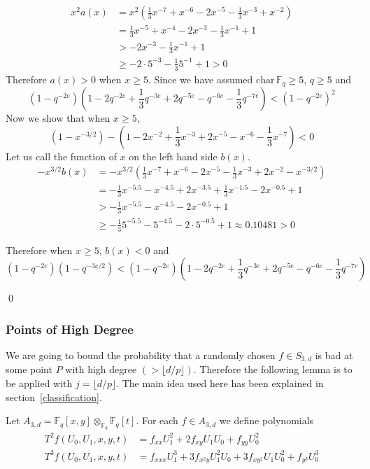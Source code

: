 \documentclass[12pt]{article}
\theoremstyle{plain}
\theoremstyle{definition}
\newcommand{\IF}{\mathbb{F}}
\newcommand{\sB}{\mathcal{B}}
\newcommand\tensor{{\otimes}}
\newcommand\union{\bigcup}
\newcommand{\<}{\langle}
\renewcommand{\>}{\rangle}
\begin{document}
\begin{align*}
x^2 a(x) &= x^2 ( \frac{1}{3} x^{-7} + x^{-6} - 2 x^{-5} - \frac{1}{3} x^{-3} + x^{-2}) \\
&= \frac{1}{3} x^{-5} + x^{-4} - 2 x^{-3} - \frac{1}{3} x^{-1} + 1 \\
&> - 2 x^{-3} - \frac{1}{3} x^{-1} + 1 \\
&\ge - 2 \cdot 5^{-3} - \frac{1}{3} 5^{-1} + 1 > 0
\end{align*}
Therefore $a(x) > 0$ when $x \ge 5$. Since we have assumed $\mathrm{char} \, \IF_q \ge 5$, $q \ge 5$ and 
$$ (1 - q^{-2e})(1 - 2q^{-2e} + \frac{1}{3} q^{-3e} + 2 q^{-5e} - q^{-6e} - \frac{1}{3} q^{-7e}) < (1 - q^{-2e})^2 $$
Now we show that when $x \ge 5$, 
$$ (1 - x^{-3/2}) - (1 - 2 x^{-2} + \frac{1}{3} x^{-3} + 2 x^{-5} - x^{-6} - \frac{1}{3} x^{-7}) < 0 $$
Let us call the function of $x$ on the left hand side $b(x)$.
\begin{align*}
- x^{3/2} b(x) &= - x^{3/2} ( \frac{1}{3} x^{-7} + x^{-6} - 2 x^{-5} - \frac{1}{3} x^{-3} + 2 x^{-2} - x^{-3/2}) \\
&= - \frac{1}{3} x^{-5.5} - x^{-4.5} + 2 x^{-3.5} + \frac{1}{3} x^{-1.5} - 2 x^{-0.5} + 1 \\
&> - \frac{1}{3} x^{-5.5} - x^{-4.5} - 2 x^{-0.5} + 1 \\
&\ge - \frac{1}{3} 5^{-5.5} - 5^{-4.5} - 2 \cdot 5^{-0.5} + 1 \approx 0.10481 > 0
\end{align*}

Therefore when $x \ge 5$, $b(x) < 0$ and 
$$ (1 - q^{-2e}) (1 - q^{-3e/2}) < (1 - q^{-2e})(1 - 2q^{-2e} + \frac{1}{3} q^{-3e} + 2 q^{-5e} - q^{-6e} - \frac{1}{3} q^{-7e})  $$

\qed



\subsubsection{Points of High Degree}
We are going to bound the probability that a randomly chosen $f \in S_{3, d}$ is bad at some point $P$ with high degree $(> \lfloor d/p \rfloor)$. Therefore the following lemma is to be applied with $j = \lfloor d/p \rfloor$. The main idea used here has been explained in section~\ref{classification}.

Let $A_{3, d} = \IF_q[x, y]\tensor_{\IF_q} \IF_q[t]$. 
For each $f \in A_{3, d}$ we define polynomials
\begin{align*}
T^2 f(U_0, U_1, x, y, t) &= f_{xx}U_1^2 + 2f_{xy} U_1 U_0 + f_{yy} U_0^2 \\
T^3 f(U_0, U_1, x, y, t) &= f_{xxx} U_1^3 + 3 f_{x^2 y} U_1^2 U_0 + 3 f_{x y^2} U_1 U_0^2 + f_{y^3} U_0^3 
\end{align*}
\end{document}
